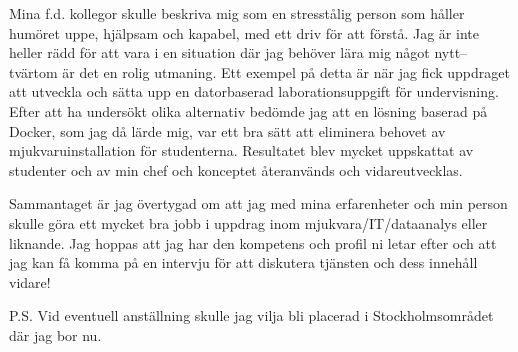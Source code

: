 \documentclass[11pt, a4paper]{../awesome-cv} %
\begin{document}
\begin{cvletter}
Mina f.d. kollegor skulle beskriva mig som en stresstålig person som håller humöret uppe, hjälpsam och kapabel, med ett driv för att förstå. 
Jag är inte heller rädd för att vara i en situation där jag behöver lära mig något nytt–tvärtom är det en rolig utmaning. 
Ett exempel på detta är när jag fick uppdraget att utveckla och sätta upp en datorbaserad laborationsuppgift för undervisning.
Efter att ha undersökt olika alternativ bedömde jag att en lösning baserad på Docker, som jag då lärde mig, var ett bra sätt att eliminera behovet av mjukvaruinstallation för studenterna.
Resultatet blev mycket uppskattat av studenter och av min chef och konceptet återanvänds och vidareutvecklas.

Sammantaget är jag övertygad om att jag med mina erfarenheter och min person skulle göra ett mycket bra jobb i uppdrag inom mjukvara/IT/dataanalys eller liknande.
Jag hoppas att jag har den kompetens och profil ni letar efter och att jag kan få komma på en intervju för att diskutera tjänsten och dess innehåll vidare!


\end{cvletter}


\makeletterclosing %

P.S. Vid eventuell anställning skulle jag vilja bli placerad i Stockholmsområdet där jag bor nu. %
\end{document}
